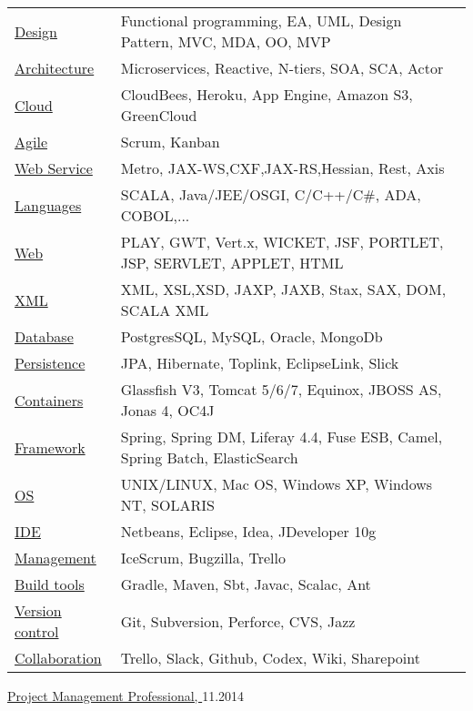 \documentclass[10pt,a4paper]{article}
\begin{document}
\vspace{8pt}
   \begin{tabular}{l p{6in}}
    \underline{Design} & Functional programming, EA, UML, Design Pattern, MVC,  MDA, OO, MVP \\
    \underline{Architecture} & Microservices, Reactive, N-tiers, SOA, SCA, Actor \\
    \underline{Cloud} & CloudBees, Heroku, App Engine, Amazon S3, GreenCloud \\
    \underline{Agile} & Scrum, Kanban \\
    \underline{Web Service} & Metro, JAX-WS,CXF,JAX-RS,Hessian, Rest, Axis \\
    \underline{Languages} & SCALA, Java/JEE/OSGI, C/C++/C\#, ADA, COBOL,... \\
    \underline{Web} & PLAY, GWT, Vert.x, WICKET, JSF, PORTLET, JSP, SERVLET, APPLET, HTML\\
    \underline{XML} & XML, XSL,XSD, JAXP, JAXB, Stax, SAX, DOM, SCALA XML\\
    \underline{Database} & PostgresSQL, MySQL, Oracle, MongoDb\\
    \underline{Persistence} & JPA, Hibernate, Toplink, EclipseLink, Slick\\
    \underline{Containers} & Glassfish V3, Tomcat 5/6/7, Equinox, JBOSS AS, Jonas 4, OC4J\\
    \underline{Framework} & Spring, Spring DM, Liferay 4.4, Fuse ESB, Camel, Spring Batch, ElasticSearch\\
    \underline{OS} & UNIX/LINUX, Mac OS, Windows XP, Windows NT, SOLARIS\\
    \underline{IDE} & Netbeans, Eclipse, Idea, JDeveloper 10g\\
    \underline{Management} & IceScrum, Bugzilla, Trello\\
    \underline{Build tools} & Gradle, Maven, Sbt, Javac, Scalac, Ant\\
    \underline{Version control} & Git, Subversion, Perforce, CVS, Jazz\\
    \underline{Collaboration} & Trello, Slack, Github, Codex, Wiki, Sharepoint\\
 \end{tabular}


\spacedhrule{0em}{-0.4em}


\headedsection
  {\href{http://www.pmi.org/}{Project Management Professional, }}
  {\textsc{11.2014}} 
  
\end{document}
